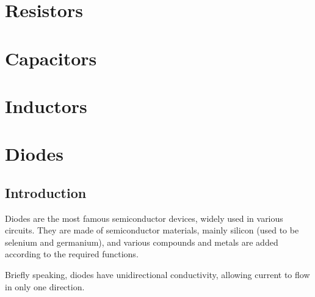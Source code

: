\documentclass[UTF8]{report}
\begin{document}
    \newpage    






\chapter{Resistors}\thispagestyle{fancy}


\chapter{Capacitors}\thispagestyle{fancy}

\chapter{Inductors}\thispagestyle{fancy}

\chapter{Diodes}\thispagestyle{fancy}

\section{Introduction}
Diodes are the most famous semiconductor devices, widely used in various circuits. They are made of semiconductor materials, mainly silicon (used to be selenium and germanium), and various compounds and metals are added according to the required functions.

Briefly speaking, diodes have unidirectional conductivity, allowing current to flow in only one direction.
\end{document}
